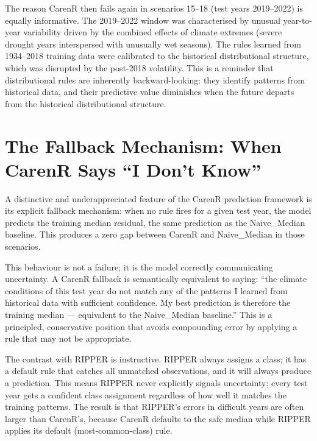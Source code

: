 The reason CarenR then fails again in scenarios 15--18 (test years 2019--2022) is equally informative. The 2019--2022 window was characterised by unusual year-to-year variability driven by the combined effects of climate extremes (severe drought years interspersed with unusually wet seasons). The rules learned from 1934--2018 training data were calibrated to the historical distributional structure, which was disrupted by the post-2018 volatility. This is a reminder that distributional rules are inherently backward-looking: they identify patterns from historical data, and their predictive value diminishes when the future departs from the historical distributional structure.


\section{The Fallback Mechanism: When CarenR Says ``I Don't Know''}\label{sec:the_fallback_mechanism_when}

A distinctive and underappreciated feature of the CarenR prediction framework is its explicit fallback mechanism: when no rule fires for a given test year, the model predicts the training median residual, the same prediction as the Naive\_Median baseline. This produces a zero gap between CarenR and Naive\_Median in those scenarios.

This behaviour is not a failure; it is the model correctly communicating uncertainty. A CarenR fallback is semantically equivalent to saying: ``the climate conditions of this test year do not match any of the patterns I learned from historical data with sufficient confidence. My best prediction is therefore the training median --- equivalent to the Naive\_Median baseline.'' This is a principled, conservative position that avoids compounding error by applying a rule that may not be appropriate.

The contrast with RIPPER is instructive. RIPPER always assigns a class; it has a default rule that catches all unmatched observations, and it will always produce a prediction. This means RIPPER never explicitly signals uncertainty; every test year gets a confident class assignment regardless of how well it matches the training patterns. The result is that RIPPER's errors in difficult years are often larger than CarenR's, because CarenR defaults to the safe median while RIPPER applies its default (most-common-class) rule.

